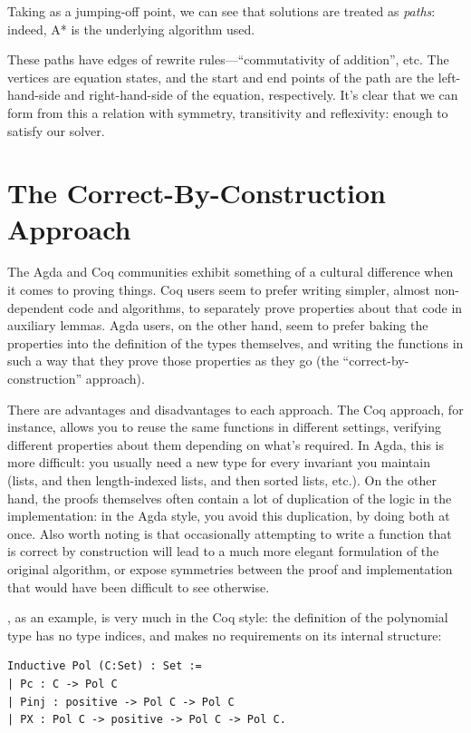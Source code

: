 \documentclass[draft, twocolumn]{article}
\theoremstyle{definition}
\theoremstyle{definition}
\begin{document}
Taking\cite{lioubartsev_constructing_2016} as a jumping-off point, we can see
that solutions are treated as \emph{paths}: indeed, A* is the underlying
algorithm used.

These paths have edges of rewrite rules---``commutativity of addition'', etc.
The vertices are equation states, and the start and end points of the path are
the left-hand-side and right-hand-side of the equation, respectively. It's clear
that we can form from this a relation with symmetry, transitivity and
reflexivity: enough to satisfy our solver.

\section{The Correct-By-Construction Approach}
The Agda and Coq communities exhibit something of a cultural difference when it
comes to proving things. Coq users seem to prefer writing simpler, almost
non-dependent code and algorithms, to separately prove properties about that
code in auxiliary lemmas. Agda users, on the other hand, seem to prefer baking
the properties into the definition of the types themselves, and writing the
functions in such a way that they prove those properties as they go (the
``correct-by-construction'' approach).

There are advantages and disadvantages to each approach. The Coq approach, for
instance, allows you to reuse the same functions in different settings,
verifying different properties about them depending on what's required. In Agda,
this is more difficult: you usually need a new type for every invariant you
maintain (lists, and then length-indexed lists, and then sorted lists, etc.). On
the other hand, the proofs themselves often contain a lot of duplication of the
logic in the implementation: in the Agda style, you avoid this duplication, by
doing both at once. Also worth noting is that occasionally attempting to write a
function that is correct by construction will lead to a much more elegant
formulation of the original algorithm, or expose symmetries between the proof
and implementation that would have been difficult to see otherwise.

\cite{gregoire_proving_2005}, as an example, is very much in the Coq style: the
definition of the polynomial type has no type indices, and makes no requirements
on its internal structure:
\begin{verbatim}
Inductive Pol (C:Set) : Set :=
| Pc : C -> Pol C
| Pinj : positive -> Pol C -> Pol C
| PX : Pol C -> positive -> Pol C -> Pol C.
\end{verbatim}
\end{document}

